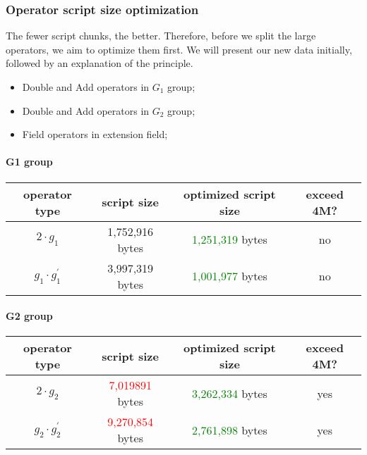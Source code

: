 \subsubsection{Operator script size optimization}

The fewer script chunks, the better. Therefore, before we split the large operators, we aim to optimize them first. We will present our new 
data initially, followed by an explanation of the principle.

\begin{itemize}
    \item Double and Add operators in $G_1$ group;
    \item Double and Add operators in $G_2$ group;
    \item Field operators in extension field;
\end{itemize}

\paragraph*{G1 group}

\begin{center}
\begin{tabular}{|c|c|c|c|} \hline
operator type & script size & optimized script size & exceed 4M? \\ \hline
$2 \cdot g_1$ & 1,752,916 bytes & \textcolor{green}{1,251,319} bytes & no  \\ \hline
$g_1 \cdot g_1^{'}$ & 3,997,319 bytes &	\textcolor{green}{1,001,977} bytes & no \\ \hline
\end{tabular}
\end{center}

\paragraph*{G2 group}

\begin{center}
\begin{tabular}{|c|c|c|c|} \hline
operator type & script size & optimized script size & exceed 4M? \\ \hline
$2 \cdot g_2$ & \textcolor{red}{7,019891} bytes & \textcolor{green}{3,262,334} bytes & yes  \\ \hline
$g_2 \cdot g_2^{'}$ & \textcolor{red}{9,270,854} bytes & \textcolor{green}{2,761,898} bytes & yes \\ \hline
\end{tabular}
\end{center}

